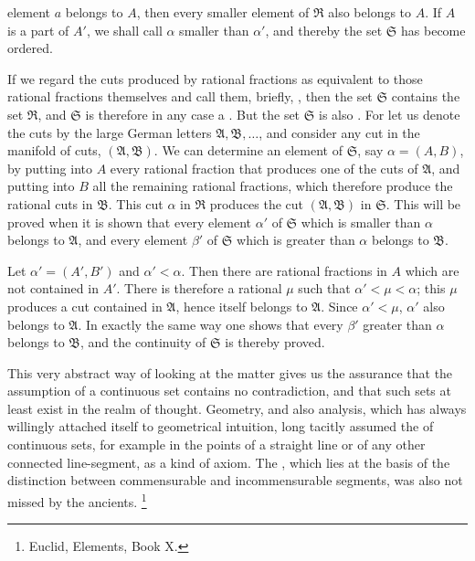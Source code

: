 element $a$ belongs to $A$, then every smaller element of $\mathfrak R$
also belongs to $A$. If $A$ is a part of $A'$, we shall call $\alpha$
smaller than $\alpha'$, and thereby the set $\mathfrak S$ has become
ordered.

If we regard the cuts produced by rational fractions as equivalent to
those rational fractions themselves and call them, briefly,
, then the set $\mathfrak S$ contains the set
$\mathfrak R$, and $\mathfrak S$ is therefore in any case a
. But the set $\mathfrak S$ is also
. For let us denote the cuts by the large German
letters $\mathfrak A,\mathfrak B,\ldots$, and consider any cut in the
manifold of cuts, $(\mathfrak A,\mathfrak B)$. We can determine an
element of $\mathfrak S$, say $\alpha=(A,B)$, by putting into $A$ every
rational fraction that produces one of the cuts of $\mathfrak A$, and
putting into $B$ all the remaining rational fractions, which therefore
produce the rational cuts in $\mathfrak B$. This cut $\alpha$ in
$\mathfrak R$ produces the cut $(\mathfrak A,\mathfrak B)$ in
$\mathfrak S$. This will be proved when it is shown that every element
$\alpha'$ of $\mathfrak S$ which is smaller than $\alpha$ belongs to
$\mathfrak A$, and every element $\beta'$ of $\mathfrak S$ which is
greater than $\alpha$ belongs to $\mathfrak B$.

Let $\alpha'=(A',B')$ and $\alpha'<\alpha$. Then there are rational
fractions in $A$ which are not contained in $A'$. There is therefore a
rational $\mu$ such that $\alpha'<\mu<\alpha$; this $\mu$ produces a
cut contained in $\mathfrak A$, hence itself belongs to $\mathfrak A$.
Since $\alpha'<\mu$, $\alpha'$ also belongs to $\mathfrak A$. In
exactly the same way one shows that every $\beta'$ greater than
$\alpha$ belongs to $\mathfrak B$, and the continuity of $\mathfrak S$
is thereby proved.

This very abstract way of looking at the matter gives us the assurance
that the assumption of a continuous set contains no contradiction, and
that such sets at least exist in the realm of thought. Geometry, and
also analysis, which has always willingly attached itself to
geometrical intuition, long tacitly assumed the  of
continuous sets, for example in the points of a straight line or of any
other connected line-segment, as a kind of axiom. The
, which lies
at the basis of the distinction between commensurable and
incommensurable segments, was also not missed by the ancients.
\setcounter{footnote}{0}\footnote{Euclid, Elements, Book X.}
